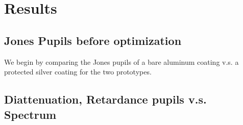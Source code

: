 \section{Results}

\subsection{Jones Pupils before optimization}
We begin by comparing the Jones pupils of a bare aluminum coating v.s. a protected silver coating for the two prototypes.

\subsection{Diattenuation, Retardance pupils v.s. Spectrum}

